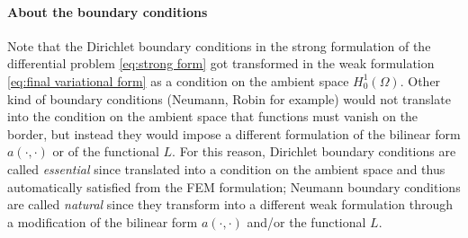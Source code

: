\paragraph{About the boundary conditions}
	Note that the Dirichlet boundary conditions in the strong formulation of the differential problem \ref{eq:strong form} got transformed in the weak formulation \ref{eq:final variational form} as a condition on the ambient space $H_0^1(\Omega)$. Other kind of boundary conditions (Neumann, Robin for example) would not translate into the condition on the ambient space that functions must vanish on the border, but instead they would impose a different formulation of the bilinear form $a(\cdot, \cdot)$ or of the functional $L$. For this reason, Dirichlet boundary conditions are called \textit{essential} since translated into a condition on the ambient space and thus automatically satisfied from the FEM formulation; Neumann boundary conditions are called \textit{natural} since they transform into a different weak formulation through a modification of the bilinear form $a(\cdot, \cdot)$ and/or the functional $L$.

